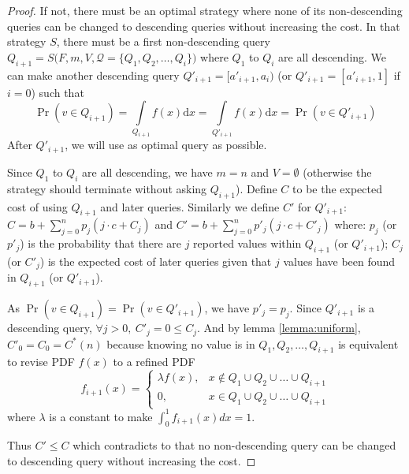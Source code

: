 \begin{proof}

If not, there must be an optimal strategy where none of its
non-descending queries can be changed to descending queries without increasing
the cost. In that strategy $S$, there must be a first non-descending query
$Q_{i+1} = S\big(F, m, V, \mathcal Q = \{Q_1, Q_2, \ldots, Q_i\}\big)$ where
$Q_1$ to $Q_i$ are all descending.  We can make another descending query
$Q'_{i+1} = [a'_{i+1}, a_i)$ (or $Q'_{i+1} = [a'_{i+1}, 1]$ if $i = 0$) such
that
\[
\Pr(v \in Q_{i+1}) = \int \limits_{Q_{i+1}} f(x) \mathrm d x = \int \limits_{Q'_{i+1}} f(x) \mathrm d x = \Pr(v \in Q'_{i+1})
\]
After $Q'_{i+1}$, we will use as optimal query as
possible.

Since $Q_1$ to $Q_i$ are all descending, we have $m = n$ and $V = \emptyset$ (otherwise
the strategy should terminate without asking $Q_{i+1}$).
Define $C$ to be the expected cost of using $Q_{i+1}$ and later queries. Similarly we define $C'$ for $Q'_{i+1}$:\\
$
C = b + \sum_{j=0}^n p_j ( j \cdot c + C_j)
$
and
$
C' = b + \sum_{j=0}^n p'_j ( j \cdot c + C'_j)
$
where:
$p_j$ (or $p'_j$) is the probability that there are $j$ reported values within $Q_{i+1}$ (or $Q'_{i+1}$);
$C_j$ (or $C'_j$) is the expected cost of later queries given that $j$ values have been
found in $Q_{i+1}$ (or $Q'_{i+1}$).

As $\Pr(v \in Q_{i+1}) = \Pr(v \in Q'_{i+1})$, we have $p'_j = p_j$. Since $Q'_{i+1}$ is a
descending query, $\forall j > 0, ~C'_j = 0 \leq C_j$. And by lemma \ref{lemma:uniform},
$C'_0 = C_0 = C^*(n)$ because knowing no value is in $Q_1, Q_2, \ldots, Q_{i+1}$ is equivalent
to revise PDF $f(x)$ to a refined PDF 
\[
f_{i+1}(x) = \begin{cases}
	\lambda f(x), & x \notin Q_1 \cup Q_2 \cup \ldots \cup Q_{i+1} \\
	0, & x \in Q_1 \cup Q_2 \cup \ldots \cup Q_{i+1}
\end{cases}
\]
where $\lambda$ is a constant to make $\int_0^1 f_{i+1}(x) dx = 1$.

Thus $C' \leq C$ which contradicts to that no non-descending query can be changed to
descending query without increasing the cost.

\end{proof}


